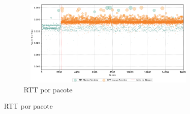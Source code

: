 \begin{apendicesenv}
\begin{figure}[htbp!]
\begin{subfigure}[t]{0.5\textwidth}
        \centering
        \caption{RTT por pacote}
        \includegraphics[width=1\textwidth, height=120pt]{USPSC-img/output/cropped/0-dos_open_multiple_secure_channels-rttp.png}
    \end{subfigure}%
\end{figure}


\end{apendicesenv}

